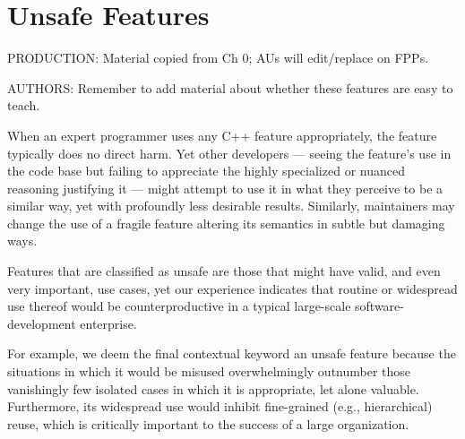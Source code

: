 
\chapter[Unsafe Features]{Unsafe Features}\label{ch-unsafe}
\emcppschapterstart{}

PRODUCTION: Material copied from Ch 0; AUs will edit/replace on FPPs. 

AUTHORS: Remember to add material about whether these features are easy to teach. 

When an expert programmer uses any C++ feature appropriately, the feature typically does no direct harm. Yet other developers --- seeing the feature’s use in the code base but failing to appreciate the highly specialized or nuanced reasoning justifying it --- might attempt to use it in what they perceive to be a similar way, yet with profoundly less desirable results. Similarly, maintainers may change the use of a fragile feature altering its semantics in subtle but damaging ways.

Features that are classified as unsafe are those that might have valid, and even very important, use cases, yet our experience indicates that routine or widespread use thereof would be counterproductive in a typical large-scale software-development enterprise.

For example, we deem the final contextual keyword an unsafe feature because the situations in which it would be misused overwhelmingly outnumber those vanishingly few isolated cases in which it is appropriate, let alone valuable. Furthermore, its widespread use would inhibit fine-grained (e.g., hierarchical) reuse, which is critically important to the success of a large organization.

\renewcommand{\cppxx}{C++11}

\newpage
{}


\newpage


